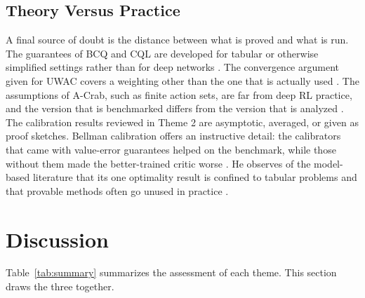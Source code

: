 \documentclass[conference]{IEEEtran}
\begin{document}
\subsection{Theory Versus Practice}
A final source of doubt is the distance between what is proved and what is run. The guarantees of BCQ and CQL are developed for tabular or otherwise simplified settings rather than for deep networks \cite{fujimoto2019bcq,kumar2020cql}. The convergence argument given for UWAC covers a weighting other than the one that is actually used \cite{wu2021uwac}. The assumptions of A-Crab, such as finite action sets, are far from deep RL practice, and the version that is benchmarked differs from the version that is analyzed \cite{zhu2023acrab}. The calibration results reviewed in Theme 2 are asymptotic, averaged, or given as proof sketches. Bellman calibration offers an instructive detail: the calibrators that came with value-error guarantees helped on the benchmark, while those without them made the better-trained critic worse \cite{vanderlaan2026bellman}. He observes of the model-based literature that its one optimality result is confined to tabular problems and that provable methods often go unused in practice \cite{he2023survey}.

\section{Discussion}
\label{sec:discussion}
Table~\ref{tab:summary} summarizes the assessment of each theme. This section draws the three together.
\end{document}
